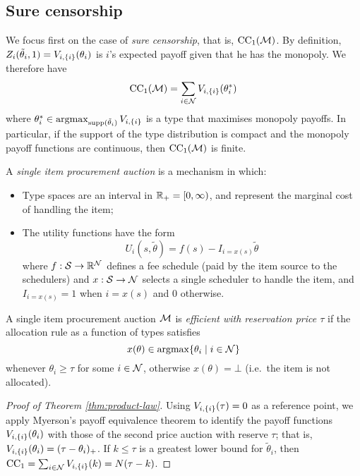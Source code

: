 \subsection{Sure censorship}

We focus first on the case of \emph{sure censorship}, that is, $\mathrm{CC}_{1}(\mathcal{M})$.
%
By definition, $Z_i(\tilde\theta_i,1) = V_{i,\{i\}}(\theta_i)$ is $i$'s expected payoff given that he has the monopoly.
%
We therefore have
%
\[
  \mathrm{CC}_{1}(\mathcal{M}) = \sum_{i\in\mathcal{N}} V_{i,\{i\}}(\theta_i^*)
\]
%
where $\theta_i^*\in\operatorname{argmax}_{\mathrm{supp}(\tilde\theta_i)} V_{i,\{i\}}$ is a type that maximises monopoly payoffs.
%
In particular, if the support of the type distribution is compact and the monopoly payoff functions are continuous, then $\mathrm{CC}_{1}(\mathcal{M})$ is finite.



\begin{definition}

  A \emph{single item procurement auction} is a mechanism in which:
  \begin{itemize}
    \item Type spaces are an interval in $\mathbb{R}_+=[0,\infty)$, and represent the marginal cost of handling the item;
    \item The utility functions have the form
    \[
      U_i(s,\tilde\theta) = f(s) - I_{i = x(s)}\tilde\theta
    \]
    where $f:\mathcal{S}\rightarrow \mathbb{R}^{\mathcal{N}}$ defines a fee schedule (paid by the item source to the schedulers) and $x:\mathcal{S}\rightarrow \mathcal{N}$ selects a single scheduler to handle the item, and $I_{i=x(s)}=1$ when $i=x(s)$ and $0$ otherwise.
  \end{itemize}

  A single item procurement auction $\mathcal{M}$ is \emph{efficient with reservation price $\tau$} if the allocation rule as a function of types satisfies
  \[
    x(\theta) \in \operatorname{argmax}\{\theta_i \mid i\in\mathcal{N}\} 
  \]
  whenever $\theta_i\geq \tau$ for some $i\in\mathcal{N}$, otherwise $x(\theta) = \bot$ (i.e.~the item is not allocated).

\end{definition}

\begin{proof}[Proof of Theorem \ref{thm:product-law}]

  Using $V_{i,\{i\}}(\tau) = 0$ as a reference point, we apply Myerson's payoff equivalence theorem \cite[Thm.~3.3]{milgrom2004putting} to identify the payoff functions $V_{i,\{i\}}(\theta_i)$ with those of the second price auction with reserve $\tau$; that is, $V_{i,\{i\}}(\theta_i) = (\tau-\theta_i)_+$.
  If $k\leq\tau $ is a greatest lower bound for $\tilde\theta_i$, then $\mathrm{CC}_{1}=\sum_{i\in\mathcal{N}}V_{i,\{i\}}(k) = N(\tau - k)$.
  \qedhere

\end{proof}


